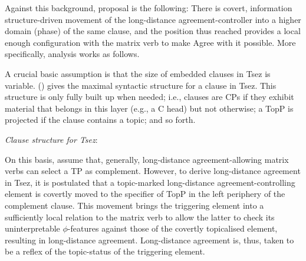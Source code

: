 \documentclass[output=paper
,modfonts
,nonflat]{langsci/langscibook}
\begin{document}
Against this background,  proposal is
the following: There is  covert, information structure-driven
  movement of the long-distance agreement-controller into a higher domain (phase) of the
  same clause, and the position thus reached provides a  local enough
  configuration with the matrix verb to make  Agree with it possible.
More specifically,  analysis works as
follows. 

A crucial basic assumption is that the size of embedded clauses in
Tsez is variable. (\Next) gives the maximal syntactic structure for a
clause in Tsez. This structure is only fully  built up when needed;
i.e., clauses are CPs if they exhibit material that belongs in this
layer (e.g., a C head) but not otherwise; a TopP is projected if the
clause contains a topic; and so forth. 

\ea\label{ex:mueller:10} {\itshape Clause \label{Tsezstructure}structure for Tsez}:\\
\z

On this  basis,  \cite{Polinsky&Potsdam:01} assume that, generally, long-distance agreement-allowing matrix
  verbs can select a TP as complement. 
However,  to derive long-distance agreement in Tsez, it is postulated
that a   topic-marked long-distance agreement-controlling element is covertly moved to the
  specifier of TopP in the left periphery of the complement clause. 
 This movement brings the triggering element into a sufficiently
  local relation to the matrix verb to allow the latter to check its
  uninterpretable $\phi$-features against those of the covertly
  topicalised element, resulting in long-distance agreement.
 Long-distance agreement is, thus, taken to be a reflex of the topic-status of the
  triggering element. 
\end{document}

